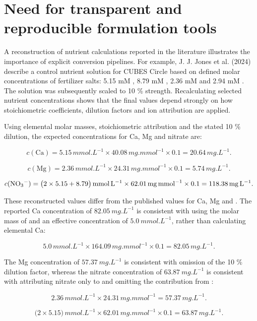 \documentclass[
  letterpaper,
  DIV=11,
  numbers=noendperiod]{scrreprt}
\begin{document}
\section{Need for transparent and reproducible formulation
tools}\label{need-for-transparent-and-reproducible-formulation-tools}

A reconstruction of nutrient calculations reported in the literature
illustrates the importance of explicit conversion pipelines. For
example, J. J. Jones et al. (2024) describe a control nutrient solution
for CUBES Circle based on defined molar concentrations of fertilizer
salts: 5.15 mM , 8.79 mM , 2.36 mM  and
2.94 mM . The solution was subsequently scaled to 10 \%
strength. Recalculating selected nutrient concentrations shows that the
final values depend strongly on how stoichiometric coefficients,
dilution factors and ion attribution are applied.

Using elemental molar masses, stoichiometric attribution and the stated
10 \% dilution, the expected concentrations for Ca, Mg and nitrate are:

\[
c(\mathrm{Ca})
= 5.15\,\si{mmol.L^{-1}}
\times 40.08\,\si{mg.mmol^{-1}}
\times 0.1
= 20.64\,\si{mg.L^{-1}}.
\]

\[
c(\mathrm{Mg})
= 2.36\,\si{mmol.L^{-1}}
\times 24.31\,\si{mg.mmol^{-1}}
\times 0.1
= 5.74\,\si{mg.L^{-1}}.
\]

\[
c(\ce{NO3-})
= \bigl(2\times 5.15 + 8.79\bigr)\,\si{mmol.L^{-1}}
\times 62.01\,\si{mg.mmol^{-1}}
\times 0.1
= 118.38\,\si{mg.L^{-1}}.
\]

These reconstructed values differ from the published values for Ca, Mg
and . The reported Ca concentration of
\(82.05\ \si{mg.L^{-1}}\) is consistent with using the molar mass of
 and an effective concentration of
\(5.0\ \si{mmol.L^{-1}}\), rather than calculating elemental Ca:

\[
5.0\,\si{mmol.L^{-1}}
\times 164.09\,\si{mg.mmol^{-1}}
\times 0.1
= 82.05\,\si{mg.L^{-1}}.
\]

The Mg concentration of \(57.37\ \si{mg.L^{-1}}\) is consistent with
omission of the 10 \% dilution factor, whereas the nitrate concentration
of \(63.87\ \si{mg.L^{-1}}\) is consistent with attributing nitrate only
to  and omitting the contribution from :

\[
2.36\,\si{mmol.L^{-1}}
\times 24.31\,\si{mg.mmol^{-1}}
= 57.37\,\si{mg.L^{-1}}.
\]

\[
\bigl(2\times 5.15\bigr)\,\si{mmol.L^{-1}}
\times 62.01\,\si{mg.mmol^{-1}}
\times 0.1
= 63.87\,\si{mg.L^{-1}}.
\]
\end{document}

